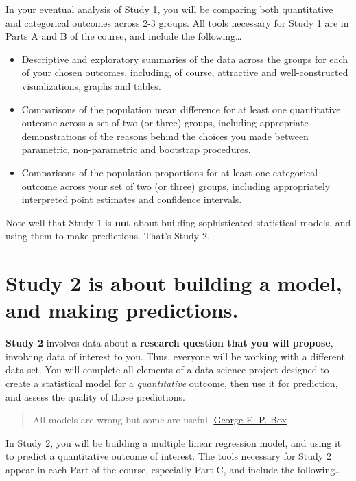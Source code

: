 \documentclass[]{book}
\providecommand{\tightlist}{%
  \setlength{\itemsep}{0pt}\setlength{\parskip}{0pt}}
\theoremstyle{definition}
\theoremstyle{definition}
\theoremstyle{definition}
\theoremstyle{remark}
\begin{document}
In your eventual analysis of Study 1, you will be comparing both
quantitative and categorical outcomes across 2-3 groups. All tools
necessary for Study 1 are in Parts A and B of the course, and include
the following\ldots{}

\begin{itemize}
\tightlist
\item
  Descriptive and exploratory summaries of the data across the groups
  for each of your chosen outcomes, including, of course, attractive and
  well-constructed visualizations, graphs and tables.
\item
  Comparisons of the population mean difference for at least one
  quantitative outcome across a set of two (or three) groups, including
  appropriate demonstrations of the reasons behind the choices you made
  between parametric, non-parametric and bootstrap procedures.
\item
  Comparisons of the population proportions for at least one categorical
  outcome across your set of two (or three) groups, including
  appropriately interpreted point estimates and confidence intervals.
\end{itemize}

Note well that Study 1 is \textbf{not} about building sophisticated
statistical models, and using them to make predictions. That's Study 2.

\hypertarget{study-2-is-about-building-a-model-and-making-predictions.}{%
\section{Study 2 is about building a model, and making
predictions.}\label{study-2-is-about-building-a-model-and-making-predictions.}}

\textbf{Study 2} involves data about a \textbf{research question that
you will propose}, involving data of interest to you. Thus, everyone
will be working with a different data set. You will complete all
elements of a data science project designed to create a statistical
model for a \emph{quantitative} outcome, then use it for prediction, and
assess the quality of those predictions.

\begin{quote}
All models are wrong but some are useful.
\href{https://en.wikipedia.org/wiki/All_models_are_wrong}{George E. P.
Box}
\end{quote}

In Study 2, you will be building a multiple linear regression model, and
using it to predict a quantitative outcome of interest. The tools
necessary for Study 2 appear in each Part of the course, especially Part
C, and include the following\ldots{}
\end{document}

